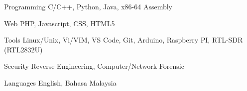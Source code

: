 

\begin{cvskills}

  \cvskill
    {Programming} %
    {C/C++, Python, Java, x86-64 Assembly} %

  \cvskill
    {Web} %
    {PHP, Javascript, CSS, HTML5} %

  \cvskill
    {Tools} %
    {Linux/Unix, Vi/VIM, VS Code, Git, Arduino, Raspberry PI, RTL-SDR (RTL2832U)} %

  \cvskill
    {Security} %
    {Reverse Engineering, Computer/Network Forensic} %

  \cvskill
    {Languages} %
    {English, Bahasa Malaysia} %

\end{cvskills}
